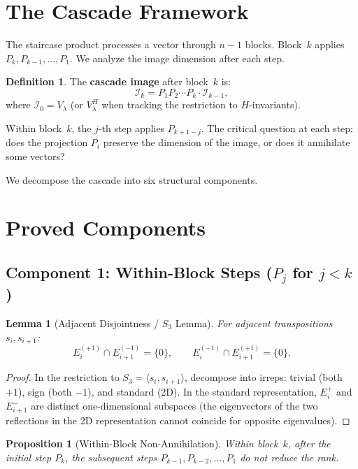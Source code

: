 \documentclass[11pt]{article}
\newtheorem{lemma}[theorem]{Lemma}
\newtheorem{proposition}[theorem]{Proposition}
\theoremstyle{definition}
\newtheorem{definition}[theorem]{Definition}
\theoremstyle{remark}
\begin{document}
\section{The Cascade Framework}

The staircase product processes a vector through $n-1$ blocks.
Block~$k$ applies $P_k, P_{k-1}, \ldots, P_1$. We analyze the
image dimension after each step.

\begin{definition}
The \textbf{cascade image} after block~$k$ is:
\[
\mathcal{I}_k = P_1 P_2 \cdots P_k \cdot \mathcal{I}_{k-1},
\]
where $\mathcal{I}_0 = V_\lambda$ (or $V_\lambda^H$ when tracking the
restriction to $H$-invariants).
\end{definition}

Within block~$k$, the $j$-th step applies $P_{k+1-j}$.
The critical question at each step: does the projection $P_i$ preserve
the dimension of the image, or does it annihilate some vectors?

We decompose the cascade into six structural components.

\section{Proved Components}

\subsection{Component 1: Within-Block Steps ($P_j$ for $j < k$)}

\begin{lemma}[Adjacent Disjointness / $S_3$ Lemma]\label{lem:adj}
For adjacent transpositions $s_i, s_{i+1}$:
\[
E_i^{(+1)} \cap E_{i+1}^{(-1)} = \{0\}, \qquad
E_i^{(-1)} \cap E_{i+1}^{(+1)} = \{0\}.
\]
\end{lemma}

\begin{proof}
In the restriction to $S_3 = \langle s_i, s_{i+1} \rangle$, decompose
into irreps: trivial (both $+1$), sign (both $-1$), and standard (2D).
In the standard representation, $E_i^+$ and $E_{i+1}^-$ are distinct
one-dimensional subspaces (the eigenvectors of the two reflections in
the 2D representation cannot coincide for opposite eigenvalues).
\end{proof}

\begin{proposition}[Within-Block Non-Annihilation]
Within block~$k$, after the initial step $P_k$, the subsequent
steps $P_{k-1}, P_{k-2}, \ldots, P_1$ do not reduce the rank.
\end{proposition}
\end{document}
